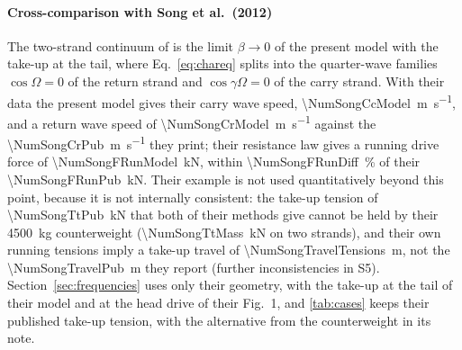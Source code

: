 \paragraph{Cross-comparison with Song et al.\ (2012)} The two-strand continuum of \citet{song2012}
is the limit $\beta\to0$ of the present model with the take-up at the tail, where
Eq.~\eqref{eq:chareq} splits into the quarter-wave families $\cos\Omega=0$ of the return strand and
$\cos\gamma\Omega=0$ of the carry strand. With their data the present model gives their carry wave
speed, \qty{\NumSongCcModel}{\metre\per\second}, and a return wave speed of
\qty{\NumSongCrModel}{\metre\per\second} against the \qty{\NumSongCrPub}{\metre\per\second} they
print; their resistance law gives a running drive force of \qty{\NumSongFRunModel}{\kilo\newton},
within \qty{\NumSongFRunDiff}{\percent} of their \qty{\NumSongFRunPub}{\kilo\newton}. Their example
is not used quantitatively beyond this point, because it is not internally consistent: the take-up
tension of \qty{\NumSongTtPub}{\kilo\newton} that both of their methods give cannot be held by their
\qty{4500}{\kilo\gram} counterweight (\qty{\NumSongTtMass}{\kilo\newton} on two strands), and their
own running tensions imply a take-up travel of \qty{\NumSongTravelTensions}{\metre}, not the
\qty{\NumSongTravelPub}{\metre} they report (further inconsistencies in S5).
Section~\ref{sec:frequencies} uses only their geometry, with the take-up at the tail of their
model and at the head drive of their Fig.~1, and \cref{tab:cases} keeps their published take-up
tension, with the alternative from the counterweight in its note.
